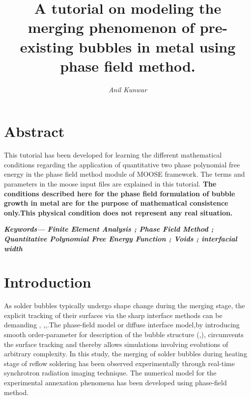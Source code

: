 \documentclass[10pt,a4paper]{article}
\providecommand{\keywords}[1]{\textbf{\textit{Keywords--- }}#1}
\begin{document}
\title{\textbf{A tutorial on modeling the merging phenomenon of pre-existing bubbles in metal using phase field method. }}
\author{\textit{Anil Kunwar} }
\maketitle

\section*{Abstract}
This tutorial has been developed for learning the different mathematical conditions regarding the application of quantitative two phase polynomial free energy in the phase field method module of MOOSE framework. The terms and parameters in the moose input files are explained in this tutorial.  \textbf{The conditions described here for the phase field formulation of bubble growth in metal are for the purpose of mathematical consistence only.This physical condition does not represent any real situation.}

\keywords{\textbf{\textit{Finite Element Analysis ; Phase Field Method ; Quantitative Polynomial Free Energy Function ; Voids ; interfacial width}}}

\section{Introduction}\label{C1_intro}
As solder bubbles typically undergo shape change during the merging stage, the  explicit tracking of their surfaces via the sharp interface methods can be demanding \citep{1}, \citep{2},\citep{3},\citep{4}.The phase-field model or diffuse interface model,by introducing smooth order-parameter for description of the bubble structure (\citep{4},\citep{5}), circumvents the surface tracking and thereby allows simulations involving evolutions of arbitrary complexity. In this study, the merging of solder bubbles during heating stage of reflow soldering has been observed experimentally through real-time synchrotron radiation imaging technique. The numerical model for the experimental annexation phenomena has been developed using phase-field method.
\end{document}
